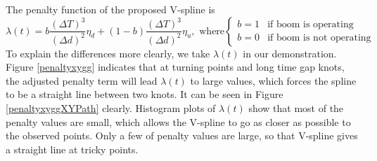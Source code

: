 The penalty function of the proposed V-spline is
\begin{equation}\label{penaltylamb}
\lambda(t)=b\frac{\left(\Delta T\right)^3}{\left(\Delta d\right)^2}\eta_d+(1-b)\frac{\left(\Delta T\right)^3}{\left(\Delta d\right)^2}\eta_u, \mbox{ where}
\begin{cases}
b=1 & \mbox{if boom is operating}\\
b=0 & \mbox{if boom is not operating}
\end{cases}
\end{equation}
To explain the differences more clearly, we take $\lambda(t)$ in our demonstration. Figure \ref{penaltyxygg} indicates that at turning points and long time gap knots, the adjusted penalty term will lead $\lambda(t)$ to large values, which forces the spline to be a straight line between two knots. It can be seen in Figure \ref{penaltyxyggXYPath} clearly. Histogram plots of $\lambda(t)$ show that most of the penalty values are small, which allows the V-spline to go as closer as possible to the observed points. Only a few of penalty values are large, so that V-spline gives a straight line at tricky points. 


